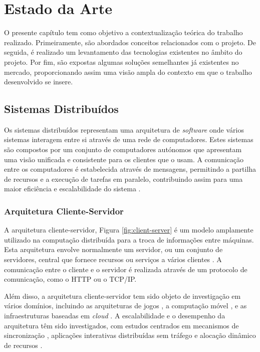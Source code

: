 \chapter{Estado da Arte}
\label{sec:2-EstadoArte}

O presente capítulo tem como objetivo a contextualização teórica do trabalho realizado. 
Primeiramente, são abordados conceitos relacionados com o projeto. De seguida, é realizado um 
levantamento das tecnologias existentes no âmbito do projeto. Por fim, são expostas algumas 
soluções semelhantes já existentes no mercado, proporcionando assim uma visão ampla do contexto em 
que o trabalho desenvolvido se insere.

\section{Sistemas Distribuídos}

Os sistemas distribuídos representam uma arquitetura de \textit{software} onde vários sistemas 
interagem entre si através de uma rede de computadores. Estes sistemas são compostos por um conjunto 
de computadores autónomos que apresentam uma visão unificada e consistente para os clientes que o 
usam. A comunicação entre os computadores é estabelecida através de mensagens, permitindo a partilha 
de recursos e a execução de tarefas em paralelo, contribuindo assim para uma maior eficiência
e escalabilidade do sistema \cite{verissimo2001distributed}.

\subsection{Arquitetura Cliente-Servidor}

A arquitetura cliente-servidor, Figura \ref{fig:client-server} é um modelo amplamente utilizado na 
computação distribuída para a troca de informações entre máquinas. Esta arquitetura envolve 
normalmente um servidor, ou um conjunto de servidores, central que fornece recursos ou serviços a 
vários clientes \cite{clientserver2019}. A comunicação entre o cliente e o servidor é realizada 
através de um protocolo de comunicação, como o HTTP ou o TCP/IP.

Além disso, a arquitetura cliente-servidor tem sido objeto de investigação em vários domínios, 
incluindo as arquiteturas de jogos \cite{clientserver2018}, a computação móvel \cite{clientserver1999},
e as infraestruturas baseadas em \textit{cloud} \cite{clientserver2012}. A escalabilidade e o 
desempenho da arquitetura têm sido investigados, com estudos centrados em mecanismos de sincronização
\cite{clientserver2004}, aplicações interativas distribuídas sem tráfego \cite{clientserver2015} e
alocação dinâmico de recursos \cite{clientserver2012}.

